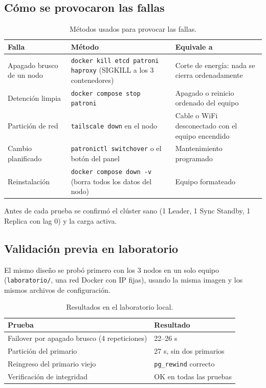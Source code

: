\documentclass[11pt,a4paper]{article}
\newcommand{\cod}[1]{\texttt{#1}}
\begin{document}
\subsection{Cómo se provocaron las fallas}

\begin{table}[H]
\centering
\small
\caption{Métodos usados para provocar las fallas.}
\begin{tabularx}{\textwidth}{@{}L{3.2cm}L{5.6cm}Y@{}}
\toprule
\textbf{Falla} & \textbf{Método} & \textbf{Equivale a} \\
\midrule
Apagado brusco de un nodo & \cod{docker kill etcd patroni haproxy} (SIGKILL a los 3 contenedores) & Corte de energía: nada se cierra ordenadamente \\
Detención limpia & \cod{docker compose stop patroni} & Apagado o reinicio ordenado del equipo \\
Partición de red & \cod{tailscale down} en el nodo & Cable o WiFi desconectado con el equipo encendido \\
Cambio planificado & \cod{patronictl switchover} o el botón del panel & Mantenimiento programado \\
Reinstalación & \cod{docker compose down -v} (borra todos los datos del nodo) & Equipo formateado \\
\bottomrule
\end{tabularx}
\end{table}

Antes de cada prueba se confirmó el clúster sano (1 Leader, 1 Sync Standby, 1 Replica con lag 0) y la carga activa.

\subsection{Validación previa en laboratorio}

El mismo diseño se probó primero con los 3 nodos en un solo equipo (\cod{laboratorio/}, una red Docker con IP fijas), usando la misma imagen y los mismos archivos de configuración.

\begin{table}[H]
\centering
\caption{Resultados en el laboratorio local.}
\begin{tabular}{@{}ll@{}}
\toprule
\textbf{Prueba} & \textbf{Resultado} \\
\midrule
Failover por apagado brusco (4 repeticiones) & 22--26 s \\
Partición del primario & 27 s, sin dos primarios \\
Reingreso del primario viejo & \cod{pg\_rewind} correcto \\
Verificación de integridad & OK en todas las pruebas \\
\bottomrule
\end{tabular}
\end{table}
\end{document}
